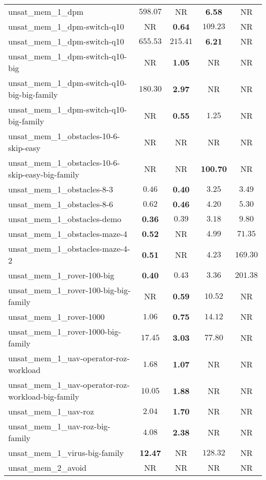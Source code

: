 \begin{tabular}{lcccc}
unsat\_mem\_1\_dpm & $598.07$ & NR & \textbf{6.58} & NR \\
unsat\_mem\_1\_dpm-switch-q10 & NR & \textbf{0.64} & $109.23$ & NR \\
unsat\_mem\_1\_dpm-switch-q10 & $655.53$ & $215.41$ & \textbf{6.21} & NR \\
unsat\_mem\_1\_dpm-switch-q10-big & NR & \textbf{1.05} & NR & NR \\
unsat\_mem\_1\_dpm-switch-q10-big-big-family & $180.30$ & \textbf{2.97} & NR & NR \\
unsat\_mem\_1\_dpm-switch-q10-big-family & NR & \textbf{0.55} & $1.25$ & NR \\
unsat\_mem\_1\_obstacles-10-6-skip-easy & NR & NR & NR & NR \\
unsat\_mem\_1\_obstacles-10-6-skip-easy-big-family & NR & NR & \textbf{100.70} & NR \\
unsat\_mem\_1\_obstacles-8-3 & $0.46$ & \textbf{0.40} & $3.25$ & $3.49$ \\
unsat\_mem\_1\_obstacles-8-6 & $0.62$ & \textbf{0.46} & $4.20$ & $5.30$ \\
unsat\_mem\_1\_obstacles-demo & \textbf{0.36} & $0.39$ & $3.18$ & $9.80$ \\
unsat\_mem\_1\_obstacles-maze-4 & \textbf{0.52} & NR & $4.99$ & $71.35$ \\
unsat\_mem\_1\_obstacles-maze-4-2 & \textbf{0.51} & NR & $4.23$ & $169.30$ \\
unsat\_mem\_1\_rover-100-big & \textbf{0.40} & $0.43$ & $3.36$ & $201.38$ \\
unsat\_mem\_1\_rover-100-big-big-family & NR & \textbf{0.59} & $10.52$ & NR \\
unsat\_mem\_1\_rover-1000 & $1.06$ & \textbf{0.75} & $14.12$ & NR \\
unsat\_mem\_1\_rover-1000-big-family & $17.45$ & \textbf{3.03} & $77.80$ & NR \\
unsat\_mem\_1\_uav-operator-roz-workload & $1.68$ & \textbf{1.07} & NR & NR \\
unsat\_mem\_1\_uav-operator-roz-workload-big-family & $10.05$ & \textbf{1.88} & NR & NR \\
unsat\_mem\_1\_uav-roz & $2.04$ & \textbf{1.70} & NR & NR \\
unsat\_mem\_1\_uav-roz-big-family & $4.08$ & \textbf{2.38} & NR & NR \\
unsat\_mem\_1\_virus-big-family & \textbf{12.47} & NR & $128.32$ & NR \\
unsat\_mem\_2\_avoid & NR & NR & NR & NR \\

\end{tabular}
